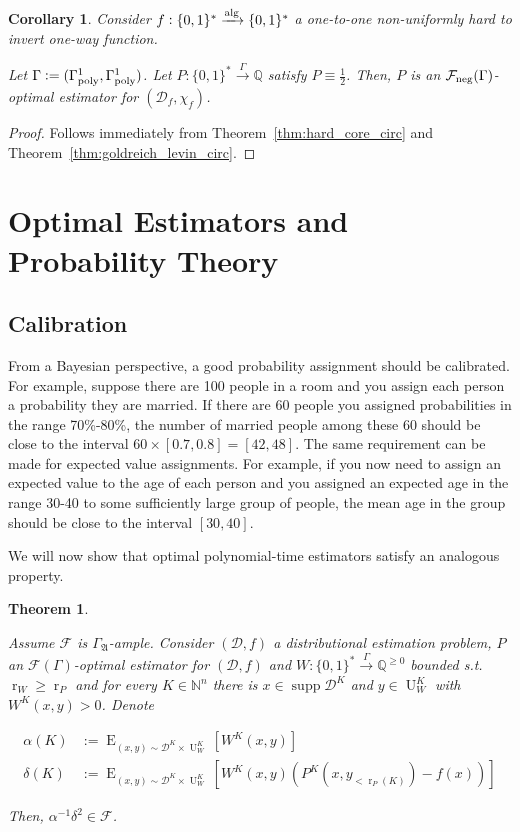 \documentclass{article}
\numberwithin{equation}{section}
\theoremstyle{definition}
\theoremstyle{plain}
\newtheorem{theorem}{Theorem}[section]
\newtheorem{corollary}{Corollary}[section]
\newcommand{\Bool}{\{0,1\}}
\newcommand{\Words}{{\Bool^*}}
\DeclareMathOperator{\Supp}{supp}
\DeclareMathOperator{\E}{E}
\DeclareMathOperator{\R}{r}
\DeclareMathOperator{\Un}{U}
\newcommand{\Nats}{\mathbb{N}}
\newcommand{\Rats}{\mathbb{Q}}
\newcommand{\Dist}{\mathcal{D}}
\newcommand{\GrowA}{\Gamma_{\mathfrak{A}}}
\newcommand{\Fall}{\mathcal{F}}
\newcommand{\EG}{\Fall(\Gamma)}
\newcommand{\GammaPoly}{\Gamma_{\textnormal{poly}}}
\newcommand{\Alg}{\xrightarrow{\textnormal{alg}}}
\newcommand{\Scheme}{\xrightarrow{\Gamma}}
\begin{document}
\begin{corollary}

Consider $f: \Words \Alg \Words$ a one-to-one non-uniformly hard to invert one-way function.

Let $\Gamma:=(\GammaPoly^1,\GammaPoly^1)$. Let $P: \Words \Scheme \Rats$ satisfy $P \equiv \frac{1}{2}$. Then, $P$ is an $\Fall_{\textnormal{neg}}(\Gamma)$-optimal estimator for $(\Dist_f, \chi_f)$.

\end{corollary}

\begin{proof}

Follows immediately from Theorem~\ref{thm:hard_core_circ} and Theorem~\ref{thm:goldreich_levin_circ}.
\end{proof}

\section{Optimal Estimators and Probability Theory}
\label{sec:probability}

\subsection{Calibration}

From a Bayesian perspective, a good probability assignment should be calibrated. For example, suppose there are 100 people in a room and you assign each person a probability they are married. If there are 60 people you assigned probabilities in the range 70\%-80\%, the number of married people among these 60 should be close to the interval $60 \times [0.7, 0.8] = [42,48]$. The same requirement can be made for expected value assignments. For example, if you now need to assign an expected value to the age of each person and you assigned an expected age in the range 30-40 to some sufficiently large group of people, the mean age in the group should be close to the interval $[30,40]$. 

We will now show that optimal polynomial-time estimators satisfy an analogous property.

\begin{theorem}
\label{thm:calib}

Assume $\Fall$ is $\GrowA$-ample. Consider $(\Dist,f)$ a distributional estimation problem, $P$ an $\EG$-optimal estimator for $(\Dist,f)$ and ${W: \Words \Scheme \Rats^{\geq 0}}$ bounded s.t. $\R_W \geq \R_P$ and for every $K \in \Nats^n$ there is $x \in \Supp \Dist^{K}$ and $y \in \Un_W^{K}$ with $W^{K}(x,y) > 0$. Denote

\begin{align*}
\alpha(K)&:=\E_{(x,y) \sim \Dist^{K} \times \Un_W^{K}}[W^{K}(x,y)] \\ 
\delta(K)&:=\E_{(x,y) \sim \Dist^{K} \times \Un_W^{K}}[W^{K}(x,y)(P^{K}(x,y_{<\R_P(K)})-f(x))]
\end{align*} 

Then, $\alpha^{-1}\delta^2 \in \Fall$.

\end{theorem}
\end{document}
